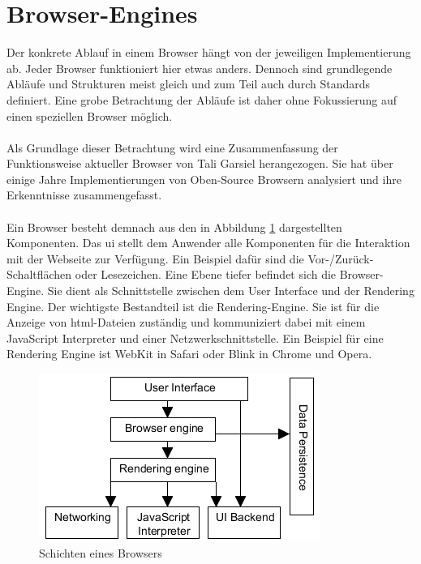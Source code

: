 \newpage
\section{Browser-Engines}
\label{browser-engines}
Der konkrete Ablauf in einem Browser hängt von der jeweiligen Implementierung ab. Jeder Browser funktioniert hier etwas anders. Dennoch sind grundlegende Abläufe und Strukturen meist gleich und zum Teil auch durch Standards definiert\cite{DOMTR}\cite{HTML-Parsing}. Eine grobe Betrachtung der Abläufe ist daher ohne Fokussierung auf einen speziellen Browser möglich. 
\\\\
Als Grundlage dieser Betrachtung wird eine Zusammenfassung der Funktionsweise aktueller Browser von Tali Garsiel herangezogen. Sie hat über einige Jahre Implementierungen von Oben-Source Browsern analysiert und ihre Erkenntnisse zusammengefasst\cite{hbw}.
\\\\
Ein Browser besteht demnach aus den in Abbildung \ref{hbw-ebenen} dargestellten Komponenten. Das \gls{ui} stellt dem Anwender alle Komponenten für die Interaktion mit der Webseite zur Verfügung. Ein Beispiel dafür sind die Vor-/Zurück-Schaltflächen oder Lesezeichen. Eine Ebene tiefer befindet sich die Browser-Engine. Sie dient als Schnittstelle zwischen dem User Interface und der Rendering Engine. Der wichtigste Bestandteil ist die Rendering-Engine. Sie ist für die Anzeige von \gls{html}-Dateien zuständig und kommuniziert dabei mit einem JavaScript Interpreter und einer Netzwerkschnittstelle. Ein Beispiel für eine Rendering Engine ist WebKit in Safari oder Blink in Chrome und Opera.\cite{Blink}\cite{WebKit}
\begin{figure}[h]
	\centering
	\includegraphics[scale=0.8]{Bilder/Browser-Layout.png}
	\caption{Schichten eines Browsers \cite{hbw}}
	\label{hbw-ebenen}
\end{figure}
